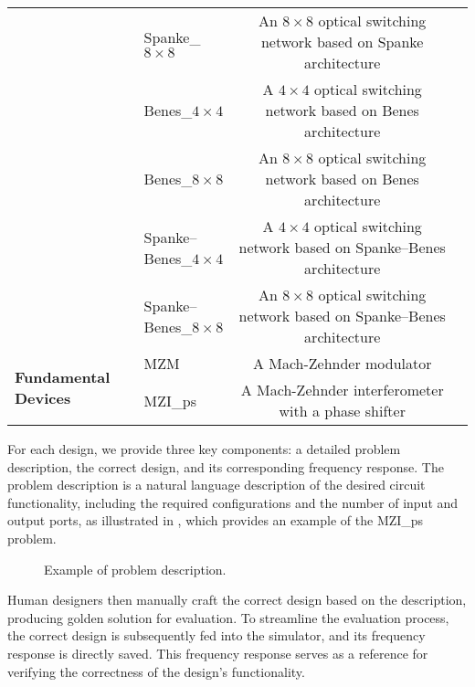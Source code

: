 \begin{table*}[htb!]
{\begin{tabular}{llcc}
         & Spanke\_$8 \times 8$ & An $8 \times 8$ optical switching network based on Spanke architecture \\
         & Benes\_$4 \times 4$ & A $4 \times 4$ optical switching network based on Benes architecture \\
         & Benes\_$8 \times 8$  & An $8 \times 8$ optical switching network based on Benes architecture  \\
         & Spanke–Benes\_$4 \times 4$  & A $4 \times 4$ optical switching network based on Spanke–Benes architecture  \\
         & Spanke–Benes\_$8 \times 8$ &  An $8 \times 8$ optical switching network based on Spanke–Benes architecture \\
         \midrule
         \multirow{2}{*}{\textbf{Fundamental Devices}} 
         & MZM & A Mach-Zehnder modulator\\
         & MZI\_ps & A Mach-Zehnder interferometer with a phase shifter \\
        \bottomrule
    \end{tabular}
    }
\end{table*}

For each design, we provide three key components: a detailed problem description, the correct design, and its corresponding frequency response.
The problem description is a natural language description of the desired circuit functionality, including the required configurations and the number of input and output ports, as illustrated in , which provides an example of the MZI\_ps problem.
\begin{figure}[!tb]
    \centering
      \caption{Example of problem description.}
      \label{fig:problem_des}
\end{figure}
Human designers then manually craft the correct design based on the description, producing golden solution for evaluation.
To streamline the evaluation process, the correct design is subsequently fed into the simulator, and its frequency response is directly saved. 
This frequency response serves as a reference for verifying the correctness of the design’s functionality.

